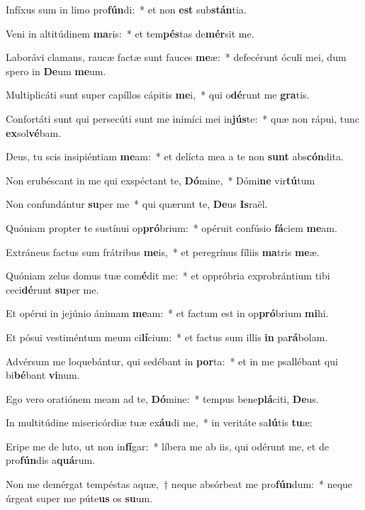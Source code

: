 \item Infíxus sum in limo pro\textbf{fún}di:~* et non \textbf{est} sub\textbf{stán}tia.
\item Veni in altitúdinem \textbf{ma}ris:~* et tem\textbf{pés}tas de\textbf{mér}sit me.
\item Laborávi clamans, raucæ factæ sunt fauces \textbf{me}æ:~* defecérunt óculi mei, dum spero in \textbf{De}um \textbf{me}um.
\item Multiplicáti sunt super capíllos cápitis \textbf{me}i,~* qui o\textbf{dé}runt me \textbf{gra}tis.
\item Confortáti sunt qui persecúti sunt me inimíci mei in\textbf{jús}te:~* quæ non rápui, tunc \textbf{ex}sol\textbf{vé}bam.
\item Deus, tu scis insipiéntiam \textbf{me}am:~* et delícta mea a te non \textbf{sunt} abs\textbf{cón}dita.
\item Non erubéscant in me qui exspéctant te, \textbf{Dó}mine,~* Dómi\textbf{ne} vir\textbf{tú}tum
\item Non confundántur \textbf{su}per me~* qui quærunt te, \textbf{De}us \textbf{Is}raël.
\item Quóniam propter te sustínui op\textbf{pró}brium:~* opéruit confúsio \textbf{fá}ciem \textbf{me}am.
\item Extráneus factus sum frátribus \textbf{me}is,~* et peregrínus fíliis \textbf{ma}tris \textbf{me}æ.
\item Quóniam zelus domus tuæ com\textbf{é}dit me:~* et oppróbria exprobrántium tibi ceci\textbf{dé}runt \textbf{su}per me.
\item Et opérui in jejúnio ánimam \textbf{me}am:~* et factum est in op\textbf{pró}brium \textbf{mi}hi.
\item Et pósui vestiméntum meum ci\textbf{lí}cium:~* et factus sum illis \textbf{in} pa\textbf{rá}bolam.
\item Advérsum me loquebántur, qui sedébant in \textbf{por}ta:~* et in me psallébant qui bi\textbf{bé}bant \textbf{vi}num.
\item Ego vero oratiónem meam ad te, \textbf{Dó}mine:~* tempus bene\textbf{plá}citi, \textbf{De}us.
\item In multitúdine misericórdiæ tuæ ex\textbf{áu}di me,~* in veritáte sa\textbf{lú}tis \textbf{tu}æ:
\item Eripe me de luto, ut non in\textbf{fí}gar:~* líbera me ab iis, qui odérunt me, et de pro\textbf{fún}dis a\textbf{quá}rum.
\item Non me demérgat tempéstas aquæ,~† neque absórbeat me pro\textbf{fún}dum:~* neque úrgeat super me púte\textbf{us} os \textbf{su}um.

